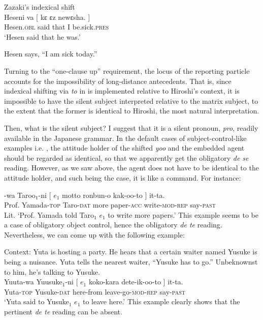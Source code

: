 \documentclass[output=paper]{langsci/langscibook}
\begin{document}
\ea\label{shimamu15} Zazaki's indexical shift  \citep[][79]{anand2006}\\ 
\gll Heseni va [ {kɛ} {ɛz} newɛsha. ]\\
Hesen.\textsc{obl} said {} that I be.sick.\textsc{pres} {} \\
\glt `Hesen said that he was.'\\
\begin{xlist}
\ex  Hesen says, ``I am sick today.''
\end{xlist}
\z

Turning to the ``one-clause up'' requirement, the locus of the reporting particle accounts for the impossibility of long-distance antecedents. That is, since indexical shifting via \textit{to} in  is implemented relative to Hiroshi's context, it is impossible to have the silent subject interpreted relative to the matrix subject, to the extent that the former is identical to Hiroshi, the most natural interpretation.

Then, what is the silent subject? I suggest that it is a silent pronoun, \textit{pro}, readily available in the Japanese grammar. In the default cases of subject-control-like examples i.e. , the attitude holder of the shifted \textit{yoo} and the embedded agent should be regarded as identical, so that we apparently get the obligatory \textit{de se} reading. However, as we saw above, the agent does not have to be identical to the attitude holder, and such being the case, it is like a command. For instance:

\ea\label{shimamu16} -wa Taroo$_1$-ni [ $e_{1}$ motto ronbun-o kak-oo-to ] it-ta.\\
{Prof. Yamada}-\textsc{top} Taro-\textsc{dat} {} {} more paper-\textsc{acc} write-\textsc{mod-rep} {} say-\textsc{past}\\
\glt Lit. `Prof. Yamada told Taro$_1$ $e_{1}$ to write more papers.'
\z
This example seems to be a case of obligatory object control, hence the obligatory \textit{de te} reading. Nevertheless, we can come up with the following example:

\ea\label{shimamu17} Context: Yuta is hosting a party. He hears that a certain waiter named Yusuke is being a nuisance. Yuta tells the nearest waiter, ``Yusuke has to go.'' Unbeknownst to him, he's talking to Yusuke.\\
\gll Yuuta-wa Yuusuke$_1$-ni [ $e_1$ koko-kara dete-ik-oo-to ] it-ta.\\
Yuta-\textsc{top} Yusuke-\textsc{dat} {} {} here-from leave-go-\textsc{mod-rep} {} say-\textsc{past}\\
\glt `Yuta said to Yusuke$_1$ $e_1$ to leave here.'
\z
This example clearly shows that the pertinent \textit{de te} reading can be absent.\largerpage
\end{document}
